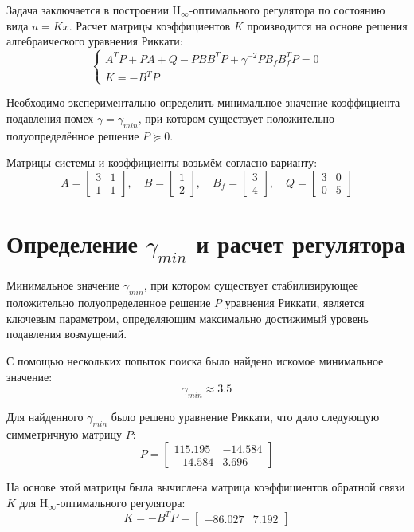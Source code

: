 \documentclass[a4paper,hidelinks,14pt]{extarticle}
\begin{document}
	Задача заключается в построении H$_\infty$-оптимального регулятора по состоянию вида $u = Kx$. Расчет матрицы коэффициентов $K$ производится на основе решения алгебраического уравнения Риккати:
	\[
	\begin{cases}
		A^T P + PA + Q - PBB^T P + \gamma^{-2}PB_f B_f^T P = 0 \\
		K = -B^T P
	\end{cases}
	\]

	Необходимо экспериментально определить минимальное значение коэффициента подавления помех $\gamma = \gamma_{min}$, при котором существует положительно полуопределённое решение $P \succcurlyeq 0$.

	Матрицы системы и коэффициенты возьмём согласно варианту:
	\[
		A = \begin{bmatrix}
			3 & 1 \\
			1 & 1
		\end{bmatrix}, \quad
		B = \begin{bmatrix}
			1 \\
			2
		\end{bmatrix}, \quad
		B_f = \begin{bmatrix}
			3 \\
			4
		\end{bmatrix}, \quad
		Q = \begin{bmatrix}
			3 & 0 \\
			0 & 5
		\end{bmatrix}
	\]

	\section{Определение $\gamma_{min}$ и расчет регулятора}

	Минимальное значение $\gamma_{min}$, при котором существует стабилизирующее положительно полуопределенное решение $P$ уравнения Риккати, является ключевым параметром, определяющим максимально достижимый уровень подавления возмущений.

	С помощью нескольких попыток поиска было найдено искомое минимальное значение:
	\[
		\gamma_{min} \approx 3.5
	\]

	Для найденного $\gamma_{min}$ было решено уравнение Риккати, что дало следующую симметричную матрицу $P$:
	\[
		P = \begin{bmatrix}
			115.195 & -14.584 \\
			-14.584 &  3.696
		\end{bmatrix}
	\]

	На основе этой матрицы была вычислена матрица коэффициентов обратной связи $K$ для H$_\infty$-оптимального регулятора:
	\[
		K = -B^T P = \begin{bmatrix}
			-86.027 & 7.192
		\end{bmatrix}
	\]
\end{document}
